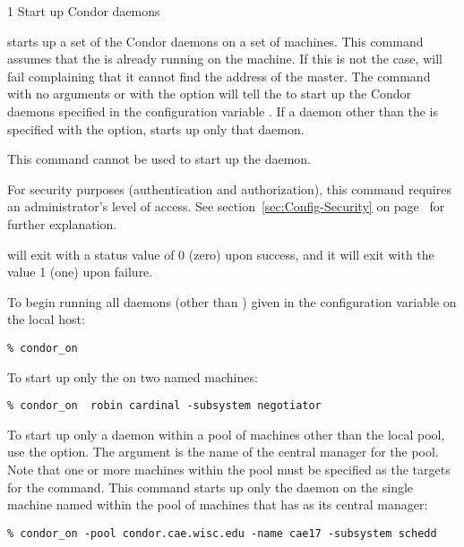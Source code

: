 \begin{ManPage}{\label{man-condor-on}}{1}
{Start up Condor daemons}
\Synopsis {}
\ToolArgsBase

\ToolDebugOption
\ToolWhere \ToolArgsAffect


\Description 

 starts up a set of the Condor daemons on a set of
machines.
This command assumes that the  is already
running on the machine.
If this is not the case,  will
fail complaining that it cannot find the address of the master.
The command  with no arguments or with
 the  option will
tell the  to start up the Condor daemons specified
in the configuration variable .
If a daemon other than the  is specified
with the  option,
 starts up only that daemon.

This command cannot be used to start up the  daemon.

For security purposes (authentication and authorization),
this command requires an administrator's level of access.
See
section~\ref{sec:Config-Security} on page~\pageref{sec:Config-Security}
for further explanation.

\begin{Options}
    \ToolArgsBaseDesc
    \ToolDebugDesc
    \ToolArgsLocateDesc
    \ToolArgsAffectDesc
\end{Options}

\ExitStatus

 will exit with a status value of 0 (zero) upon success,
and it will exit with the value 1 (one) upon failure.

\Examples
To begin running all daemons (other than ) given
in the configuration variable 
on the local host:
\begin{verbatim}
% condor_on
\end{verbatim}

To start up only the  on two named machines:
\begin{verbatim}
% condor_on  robin cardinal -subsystem negotiator
\end{verbatim}

To start up only a daemon within a pool of machines
other than the local pool, use the  option.
The argument is the name of the central manager for the pool.
Note that one or more machines within the pool must be
specified as the targets for the command.
This command starts up only the  daemon
on the single machine named  within the
pool of machines that has  as
its central manager:
\begin{verbatim}
% condor_on -pool condor.cae.wisc.edu -name cae17 -subsystem schedd
\end{verbatim}

\end{ManPage}
